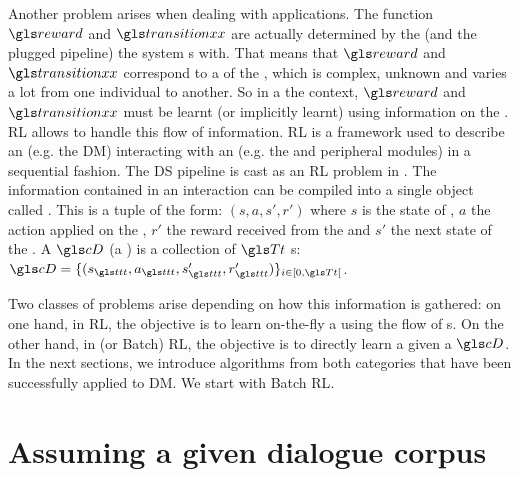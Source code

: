 Another problem arises when dealing with  applications. The function $\reward$ and $\transition$ are actually determined by the  (and the plugged pipeline) the system s with. That means that $\reward$ and $\transition$ correspond to a  of the , which is complex, unknown and varies a lot from one individual to another.
%
So in a the  context, $\reward$ and $\transition$ must be learnt (or implicitly learnt) using information on the . \gls{RL} allows to handle this flow of information. \gls{RL} is a framework used to describe an  (e.g. the \gls{DM}) interacting with an  (e.g. the  and peripheral modules) in a sequential fashion. The \gls{DS} pipeline is cast as an \gls{RL} problem in . The information contained in an interaction can be compiled into a single object called . This is a tuple of the form: $(s, a, s', r')$ where $s$ is the state of , $a$ the action applied on the , $r'$ the reward received from the  and $s'$ the next state of the . A  $\cD$ (a ) is a collection of $\T$ s: $\cD = \{(s_{\indextransition},a_{\indextransition},s'_{\indextransition},r'_{\indextransition})\}_{i\in \left[0,\T \right[}$.

Two classes of problems arise depending on how this information is gathered: on one hand, in  \gls{RL}, the objective is to learn on-the-fly a  using the flow of s. On the other hand, in  (or Batch) \gls{RL}, the objective is to directly learn a  given a  $\cD$. In the next sections, we introduce algorithms from both categories that have been successfully applied to \gls{DM}. We start with Batch \gls{RL}.

\section{Assuming a given dialogue corpus}

